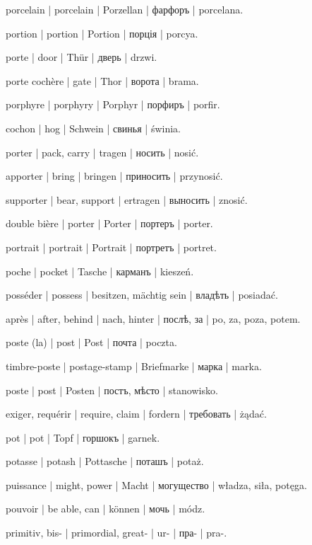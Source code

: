 \begin{outdent}{1em}
porcelain | porcelain | Porzellan | фарфоръ | porcelana.

portion | portion | Portion | порція | porcya.

porte | door | Thür | дверь | drzwi.

\uvsubentry{}
porte cochère | gate | Thor | ворота | brama.

porphyre | porphyry | Porphyr | порфиръ | porfir.

cochon | hog | Schwein | свинья | świnia.

porter | pack, carry | tragen | носить | nosić.

\uvsubentry{}
apporter | bring | bringen | приносить | przynosić.


\uvsubentry{}
supporter | bear, support | ertragen | выносить | znosić.

double bière | porter | Porter | портеръ | porter.

portrait | portrait | Portrait | портретъ | portret.

poche | pocket | Tasche | карманъ | kieszeń.

posséder | possess | besitzen, mächtig sein | владѣть | posiadać.

après | after, behind | nach, hinter | послѣ, за | po, za, poza, potem.

poste (la) | post | Post | почта | poczta.

\uvsubentry{}
timbre-poste | postage-stamp | Briefmarke | марка | marka.

poste | post | Posten | постъ, мѣсто | stanowisko.

exiger, requérir | require, claim | fordern | требовать | żądać.

pot | pot | Topf | горшокъ | garnek.

potasse | potash | Pottasche | поташъ | potaż.

puissance | might, power | Macht | могущество | władza,
siła, potęga.

pouvoir | be able, can | können | мочь | módz.

primitiv, bis- | primordial, great- | ur- | пра- | pra-.


\end{outdent}
